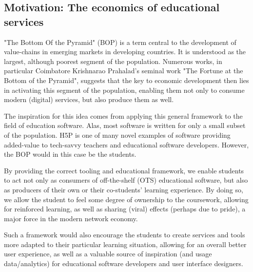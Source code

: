 \subsection{Motivation: The economics of educational services}

"The Bottom Of the Pyramid" (BOP) is a term central to the development of
value-chains in emerging markets in developing countries. It is understood as
the largest, although poorest segment of the population. Numerous works, in
particular Coimbatore Krishnarao Prahalad's seminal work "The Fortune at the
Bottom of the Pyramid", suggests that the key to economic development then lies
in activating this segment of the population, enabling them not only to consume
modern (digital) services, but also produce them as well.

The inspiration for this idea comes from applying this general framework to the
field of education software. Alas, most software is written for only a small
subset of the population. H5P is one of many novel examples of software
providing added-value to tech-savvy teachers and educational software
developers. However, the BOP would in this case be the students.

By providing the correct tooling and educational framework, we enable students
to act not only as consumers of off-the-shelf (OTS) educational software, but
also as producers of their own or their co-students' learning experience. By
doing so, we allow the student to feel some degree of ownership to the
coursework, allowing for reinforced learning, as well as sharing (viral) effects
(perhaps due to pride), a major force in the modern network economy.

Such a framework would also encourage the students to create services and tools
more adapted to their particular learning situation, allowing for an overall
better user experience, as well as a valuable source of inspiration (and usage
data/analytics) for educational software developers and user interface
designers.
